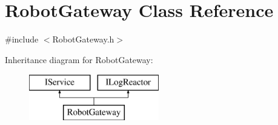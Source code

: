 \hypertarget{class_robot_gateway}{}\section{Robot\+Gateway Class Reference}
\label{class_robot_gateway}


{\ttfamily \#include $<$Robot\+Gateway.\+h$>$}

Inheritance diagram for Robot\+Gateway\+:\begin{figure}[H]
\begin{center}
\leavevmode
\includegraphics[height=2.000000cm]{class_robot_gateway}
\end{center}
\end{figure}
